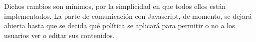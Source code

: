 
Dichos cambios son mínimos, por la simplicidad en que todos ellos están implementados. La parte de comunicación con Javascript, de momento, se dejará abierta hasta que se decida qué política se aplicará para permitir o no a los usuarios ver o editar sus contenidos.



